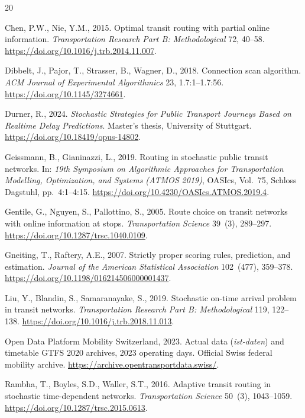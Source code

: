 \begin{thebibliography}{20}

Chen, P.W., Nie, Y.M., 2015. Optimal transit routing with partial online
information. \emph{Transportation Research Part B: Methodological} 72, 40--58.
\url{https://doi.org/10.1016/j.trb.2014.11.007}.

Dibbelt, J., Pajor, T., Strasser, B., Wagner, D., 2018. Connection scan
algorithm. \emph{ACM Journal of Experimental Algorithmics} 23, 1.7:1--1.7:56.
\url{https://doi.org/10.1145/3274661}.

Durner, R., 2024. \emph{Stochastic Strategies for Public Transport Journeys
Based on Realtime Delay Predictions}. Master's thesis, University of Stuttgart.
\url{https://doi.org/10.18419/opus-14802}.

Geissmann, B., Gianinazzi, L., 2019. Routing in stochastic public transit
networks. In: \emph{19th Symposium on Algorithmic Approaches for Transportation
Modelling, Optimization, and Systems (ATMOS 2019)}, OASIcs, Vol.~75, Schloss
Dagstuhl, pp.~4:1--4:15. \url{https://doi.org/10.4230/OASIcs.ATMOS.2019.4}.

Gentile, G., Nguyen, S., Pallottino, S., 2005. Route choice on transit networks
with online information at stops. \emph{Transportation Science} 39~(3),
289--297. \url{https://doi.org/10.1287/trsc.1040.0109}.

Gneiting, T., Raftery, A.E., 2007. Strictly proper scoring rules, prediction,
and estimation. \emph{Journal of the American Statistical Association}
102~(477), 359--378. \url{https://doi.org/10.1198/016214506000001437}.

Liu, Y., Blandin, S., Samaranayake, S., 2019. Stochastic on-time arrival problem
in transit networks. \emph{Transportation Research Part B: Methodological}
119, 122--138. \url{https://doi.org/10.1016/j.trb.2018.11.013}.

Open Data Platform Mobility Switzerland, 2023. Actual data (\emph{ist-daten})
and timetable GTFS 2020 archives, 2023 operating days. Official Swiss federal
mobility archive. \url{https://archive.opentransportdata.swiss/}.

Rambha, T., Boyles, S.D., Waller, S.T., 2016. Adaptive transit routing in
stochastic time-dependent networks. \emph{Transportation Science} 50~(3),
1043--1059. \url{https://doi.org/10.1287/trsc.2015.0613}.


\end{thebibliography}
